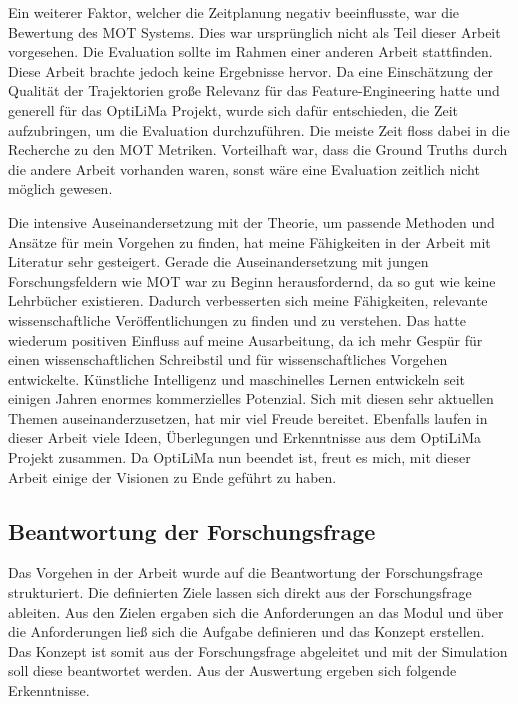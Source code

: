 Ein weiterer Faktor, welcher die Zeitplanung negativ beeinflusste, war die Bewertung des MOT Systems. Dies war ursprünglich nicht als Teil dieser Arbeit vorgesehen. Die Evaluation sollte im Rahmen einer anderen Arbeit stattfinden. Diese Arbeit brachte jedoch keine Ergebnisse hervor. Da eine Einschätzung der Qualität der Trajektorien große Relevanz für das Feature-Engineering hatte und generell für das \acrshort{OptiLiMa} Projekt, wurde sich dafür entschieden, die Zeit aufzubringen, um die Evaluation durchzuführen. Die meiste Zeit floss dabei in die Recherche zu den MOT Metriken. Vorteilhaft war, dass die Ground Truths durch die andere Arbeit vorhanden waren, sonst wäre eine Evaluation zeitlich nicht möglich gewesen.\par

Die intensive Auseinandersetzung mit der Theorie, um passende Methoden und Ansätze für mein Vorgehen zu finden, hat meine Fähigkeiten in der Arbeit mit Literatur sehr gesteigert. Gerade die Auseinandersetzung mit jungen Forschungsfeldern wie MOT war zu Beginn herausfordernd, da so gut wie keine Lehrbücher existieren. Dadurch verbesserten sich meine Fähigkeiten, relevante wissenschaftliche Veröffentlichungen zu finden und zu verstehen. Das hatte wiederum positiven Einfluss auf meine Ausarbeitung, da ich mehr Gespür für einen wissenschaftlichen Schreibstil und für wissenschaftliches Vorgehen entwickelte. Künstliche Intelligenz und maschinelles Lernen entwickeln seit einigen Jahren enormes kommerzielles Potenzial. Sich mit diesen sehr aktuellen Themen auseinanderzusetzen, hat mir viel Freude bereitet. Ebenfalls laufen in dieser Arbeit viele Ideen, Überlegungen und Erkenntnisse aus dem \acrshort{OptiLiMa} Projekt zusammen. Da \acrshort{OptiLiMa} nun beendet ist, freut es mich, mit dieser Arbeit einige der Visionen zu Ende geführt zu haben.\par


\subsection{Beantwortung der Forschungsfrage}
Das Vorgehen in der Arbeit wurde auf die Beantwortung der Forschungsfrage strukturiert. Die definierten Ziele lassen sich direkt aus der Forschungsfrage ableiten. Aus den Zielen ergaben sich die Anforderungen an das Modul und über die Anforderungen ließ sich die Aufgabe definieren und das Konzept erstellen. Das Konzept ist somit aus der Forschungsfrage abgeleitet und mit der Simulation soll diese beantwortet werden. Aus der Auswertung ergeben sich folgende Erkenntnisse.\par

